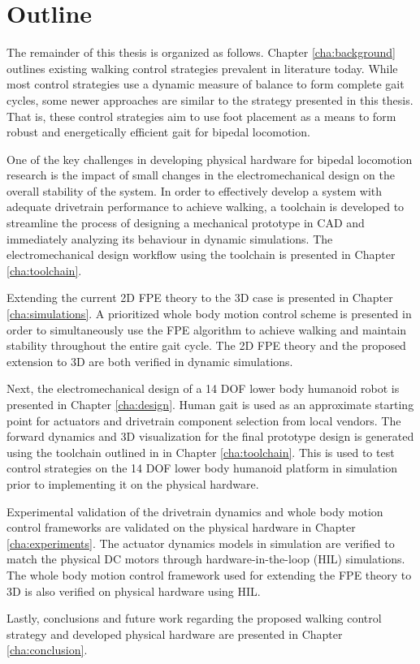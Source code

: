 \section{Outline} %
\label{sec:outline}
The remainder of this thesis is organized as follows. Chapter \ref{cha:background} outlines existing walking control strategies prevalent in literature today. While most control strategies use a dynamic measure of balance to form complete gait cycles, some newer approaches are similar to the strategy presented in this thesis. That is, these control strategies aim to use foot placement as a means to form robust and energetically efficient gait for bipedal locomotion. 

One of the key challenges in developing physical hardware for bipedal locomotion research is the impact of small changes in the electromechanical design on the overall stability of the system. In order to effectively develop a system with adequate drivetrain performance to achieve walking, a toolchain is developed to streamline the process of designing a mechanical prototype in CAD and immediately analyzing its behaviour in dynamic simulations. The electromechanical design workflow using the toolchain is presented in Chapter \ref{cha:toolchain}. 

Extending the current 2D FPE theory to the 3D case is presented in Chapter \ref{cha:simulations}. A prioritized whole body motion control scheme is presented in order to simultaneously use the FPE algorithm to achieve walking and maintain stability throughout the entire gait cycle. The 2D FPE theory and the proposed extension to 3D are both verified in dynamic simulations. 

Next, the electromechanical design of a 14 DOF lower body humanoid robot is presented in Chapter \ref{cha:design}. Human gait is used as an approximate starting point for actuators and drivetrain component selection from local vendors. The forward dynamics and 3D visualization for the final prototype design is generated using the toolchain outlined in in Chapter \ref{cha:toolchain}. This is used to test control strategies on the 14 DOF lower body humanoid platform in simulation prior to implementing it on the physical hardware. 

Experimental validation of the drivetrain dynamics and whole body motion control frameworks are validated on the physical hardware in Chapter \ref{cha:experiments}. The actuator dynamics models in simulation are verified to match the physical DC motors through hardware-in-the-loop (HIL) simulations. The whole body motion control framework used for extending the FPE theory to 3D is also verified on physical hardware using HIL.  

Lastly, conclusions and future work regarding the proposed walking control strategy and developed physical hardware are presented in Chapter \ref{cha:conclusion}. 

